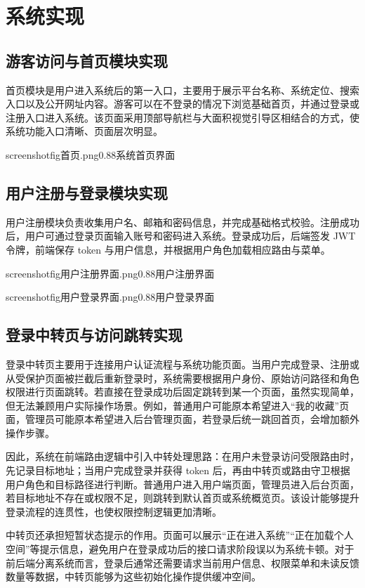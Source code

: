\documentclass[12pt,a4paper]{ctexart}
\begin{document}
\clearpage
\section{系统实现}

\subsection{游客访问与首页模块实现}
首页模块是用户进入系统后的第一入口，主要用于展示平台名称、系统定位、搜索入口以及公开网址内容。游客可以在不登录的情况下浏览基础首页，并通过登录或注册入口进入系统。该页面采用顶部导航栏与大面积视觉引导区相结合的方式，使系统功能入口清晰、页面层次明显。

screenshotfig{首页.png}{0.88}{系统首页界面}

\subsection{用户注册与登录模块实现}
用户注册模块负责收集用户名、邮箱和密码信息，并完成基础格式校验。注册成功后，用户可通过登录页面输入账号和密码进入系统。登录成功后，后端签发 JWT 令牌，前端保存 token 与用户信息，并根据用户角色加载相应路由与菜单。

screenshotfig{用户注册界面.png}{0.88}{用户注册界面}

screenshotfig{用户登录界面.png}{0.88}{用户登录界面}

\subsection{登录中转页与访问跳转实现}
登录中转页主要用于连接用户认证流程与系统功能页面。当用户完成登录、注册或从受保护页面被拦截后重新登录时，系统需要根据用户身份、原始访问路径和角色权限进行页面跳转。若直接在登录成功后固定跳转到某一个页面，虽然实现简单，但无法兼顾用户实际操作场景。例如，普通用户可能原本希望进入“我的收藏”页面，管理员可能原本希望进入后台管理页面，若登录后统一跳回首页，会增加额外操作步骤。

因此，系统在前端路由逻辑中引入中转处理思路：在用户未登录访问受限路由时，先记录目标地址；当用户完成登录并获得 token 后，再由中转页或路由守卫根据用户角色和目标路径进行判断。普通用户进入用户端页面，管理员进入后台页面，若目标地址不存在或权限不足，则跳转到默认首页或系统概览页。该设计能够提升登录流程的连贯性，也使权限控制逻辑更加清晰。

中转页还承担短暂状态提示的作用。页面可以展示“正在进入系统”“正在加载个人空间”等提示信息，避免用户在登录成功后的接口请求阶段误以为系统卡顿。对于前后端分离系统而言，登录后通常还需要请求当前用户信息、权限菜单和未读反馈数量等数据，中转页能够为这些初始化操作提供缓冲空间。
\end{document}
